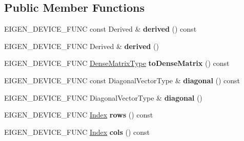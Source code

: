 \subsection*{Public Member Functions}
\begin{DoxyCompactItemize}
\item 
\mbox{\label{class_eigen_1_1_diagonal_base_a3c99bfd342f96df1e795cfa82672686e}} 
E\+I\+G\+E\+N\+\_\+\+D\+E\+V\+I\+C\+E\+\_\+\+F\+U\+NC const Derived \& {\bfseries derived} () const
\item 
\mbox{\label{class_eigen_1_1_diagonal_base_a7469600c500a349e1b728ba86eb9b267}} 
E\+I\+G\+E\+N\+\_\+\+D\+E\+V\+I\+C\+E\+\_\+\+F\+U\+NC Derived \& {\bfseries derived} ()
\item 
\mbox{\label{class_eigen_1_1_diagonal_base_a578b87659abce86f82c21e012577f64a}} 
E\+I\+G\+E\+N\+\_\+\+D\+E\+V\+I\+C\+E\+\_\+\+F\+U\+NC \hyperlink{group___core___module_class_eigen_1_1_matrix}{Dense\+Matrix\+Type} {\bfseries to\+Dense\+Matrix} () const
\item 
\mbox{\label{class_eigen_1_1_diagonal_base_a98d954efacff5c32f7acbb1f51050673}} 
E\+I\+G\+E\+N\+\_\+\+D\+E\+V\+I\+C\+E\+\_\+\+F\+U\+NC const Diagonal\+Vector\+Type \& {\bfseries diagonal} () const
\item 
\mbox{\label{class_eigen_1_1_diagonal_base_a094f1467bf3ebbbe0db30520275940f6}} 
E\+I\+G\+E\+N\+\_\+\+D\+E\+V\+I\+C\+E\+\_\+\+F\+U\+NC Diagonal\+Vector\+Type \& {\bfseries diagonal} ()
\item 
\mbox{\label{class_eigen_1_1_diagonal_base_a29c20477a3fc4092919fd3b0b28574f3}} 
E\+I\+G\+E\+N\+\_\+\+D\+E\+V\+I\+C\+E\+\_\+\+F\+U\+NC \hyperlink{group___core___module_a554f30542cc2316add4b1ea0a492ff02}{Index} {\bfseries rows} () const
\item 
\mbox{\label{class_eigen_1_1_diagonal_base_ab2f60c33e1a0024414d6bb129d34bb4b}} 
E\+I\+G\+E\+N\+\_\+\+D\+E\+V\+I\+C\+E\+\_\+\+F\+U\+NC \hyperlink{group___core___module_a554f30542cc2316add4b1ea0a492ff02}{Index} {\bfseries cols} () const
\item 

\end{DoxyCompactItemize}
